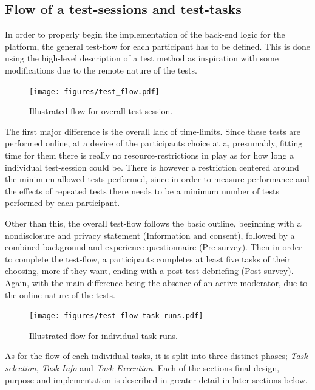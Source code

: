 {\subsection{Flow of a test-sessions and test-tasks}

	In order to properly begin the implementation of the back-end logic for the
	platform, the general test-flow for each participant has to be defined. This
	is done using the high-level description of a test
	method\cite[p.78]{citeHandbookUsability} as inspiration with some
	modifications due to the remote nature of the tests.

  \begin{figure}[h!]
    \centering
    \texttt{[image: figures/test\_flow.pdf]}
    \caption{Illustrated flow for overall test-session.}
  \end{figure}

  The first major difference is the overall lack of time-limits. Since these
  tests are performed online, at a device of the participants choice at a,
  presumably, fitting time for them there is really no resource-restrictions in
  play as for how long a individual test-session could be. There is however a
  restriction centered around the minimum allowed tests performed, since in
  order to measure performance and the effects of repeated tests there needs to
  be a minimum number of tests performed by each participant.

  Other than this, the overall test-flow follows the basic outline, beginning
  with a nondisclosure and privacy statement (Information and consent),
  followed by a combined background and experience questionnaire (Pre-survey).
  Then in order to complete the test-flow, a participants completes at least
  five tasks of their choosing, more if they want, ending with a post-test
  debriefing (Post-survey). Again, with the main difference being the absence
  of an active moderator, due to the online nature of the tests.

  \begin{figure}[h!]
    \centering
    \texttt{[image: figures/test\_flow\_task\_runs.pdf]}
    \caption{Illustrated flow for individual task-runs.}
  \end{figure}

  As for the flow of each individual tasks, it is split into three distinct phases;
  \textit{Task selection},
  \textit{Task-Info} and
  \textit{Task-Execution}.
  Each of the sections final design, purpose and implementation is
  described in greater detail in later sections below.

}
